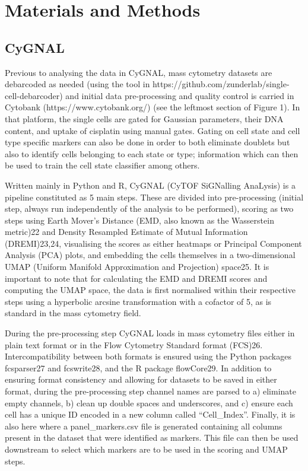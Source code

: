 \chapter{Materials and Methods}
\label{02methods}

\section{CyGNAL}

Previous to analysing the data in CyGNAL, mass cytometry datasets are debarcoded as needed (using the tool in https://github.com/zunderlab/single-cell-debarcoder) and initial data pre-processing and quality control is carried in Cytobank (https://www.cytobank.org/) (see the leftmost section of Figure 1). In that platform, the single cells are gated for Gaussian parameters, their DNA content, and uptake of cisplatin using manual gates. Gating on cell state and cell type specific markers can also be done in order to both eliminate doublets but also to identify cells belonging to each state or type; information which can then be used to train the cell state classifier among others.

Written mainly in Python and R, CyGNAL (CyTOF SiGNalling AnaLysis) is a pipeline constituted as 5 main steps. These are divided into pre-processing (initial step, always run independently of the analysis to be performed), scoring as two steps using  Earth Mover’s Distance (EMD, also known as the Wasserstein metric)22 and Density Resampled Estimate of Mutual Information (DREMI)23,24, visualising the scores as either heatmaps or Principal Component Analysis (PCA) plots, and embedding the cells themselves in a two-dimensional UMAP (Uniform Manifold Approximation and Projection) space25. It is important to note that for calculating the EMD and DREMI scores and computing the UMAP space, the data is first normalised within their respective steps using a hyperbolic arcsine transformation with a cofactor of 5, as is standard in the mass cytometry field.

During the pre-processing step CyGNAL loads in mass cytometry files either in plain text format or in the Flow Cytometry Standard format (FCS)26. Intercompatibility between both formats is ensured using the Python packages fcsparser27 and fcswrite28, and the R package flowCore29. In addition to ensuring format consistency and allowing for datasets to be saved in either format, during the pre-processing step channel names are parsed to a) eliminate empty channels, b) clean up double spaces and underscores, and c) ensure each cell has a unique ID encoded in a new column called “Cell\_Index”. Finally, it is also here where a panel\_markers.csv file is generated containing all columns present in the dataset that were identified as markers. This file can then be used downstream to select which markers are to be used in the scoring and UMAP steps.

